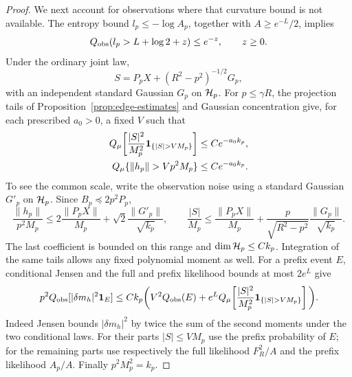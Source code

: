 \begin{proof}
We next account for observations where that curvature bound is not
available.  The entropy bound \(l_p\le-\log A_p\), together with
\(A\ge e^{-L}/2\), implies
\begin{equation}
 Q_{\rm obs}(l_p>L+\log2+z)\le e^{-z},\qquad z\ge0.
                                                               \label{warm:bridge-entropy-tail}
\end{equation}
Under the ordinary joint law,
\[
 S=P_pX+(R^2-p^2)^{-1/2}G_p,
\]
with an independent standard Gaussian \(G_p\) on \(\mathcal H_p\).
For \(p\le\gamma R\), the projection tails of
Proposition~\ref{prop:edge-estimates} and Gaussian concentration give,
for each prescribed \(a_0>0\), a fixed \(V\) such that
\begin{equation}\label{warm:bridge-input-tails}
 \begin{split}
 Q_\mu\!\left[\frac{|S|^2}{M_p^2}
       \ind_{\{|S|>VM_p\}}\right]&\le Ce^{-a_0k_p},\\
 Q_\mu\{\|h_p\|>Vp^2M_p\}&\le Ce^{-a_0k_p}.
 \end{split}
\end{equation}
To see the common scale, write the observation noise using a standard
Gaussian \(G'_p\) on \(\mathcal H_p\).  Since \(B_p\preceq2p^2P_p\),
\[
 \frac{\|h_p\|}{p^2M_p}
 \le2\frac{\|P_pX\|}{M_p}+\sqrt2\frac{\|G'_p\|}{\sqrt{k_p}},
 \qquad
 \frac{|S|}{M_p}
 \le\frac{\|P_pX\|}{M_p}
       +\frac p{\sqrt{R^2-p^2}}\frac{\|G_p\|}{\sqrt{k_p}}.
\]
The last coefficient is bounded on this range and
\(\dim\mathcal H_p\le Ck_p\).  Integration of the same tails allows any
fixed polynomial moment as well.  For a prefix event \(E\), conditional Jensen and
the full and prefix likelihood bounds at most \(2e^L\) give
\begin{equation}
\begin{split}
 p^2Q_{\rm obs}[|\delta m_h|^2\ind_E]
 \le Ck_p\bigg(
 V^2Q_{\rm obs}(E)
 +e^L Q_\mu\!\left[
       \frac{|S|^2}{M_p^2}\ind_{\{|S|>VM_p\}}\right]\bigg).
\end{split}                                                     \label{warm:discarded-bridge}
\end{equation}
Indeed Jensen bounds \(|\delta m_h|^2\) by twice the sum of the
second moments under the two conditional laws.  For their parts
\(|S|\le VM_p\) use the prefix probability of \(E\); for the
remaining parts use respectively the full likelihood \(F_R^2/A\)
and the prefix likelihood \(A_p/A\).  Finally \(p^2M_p^2=k_p\).


\end{proof}
